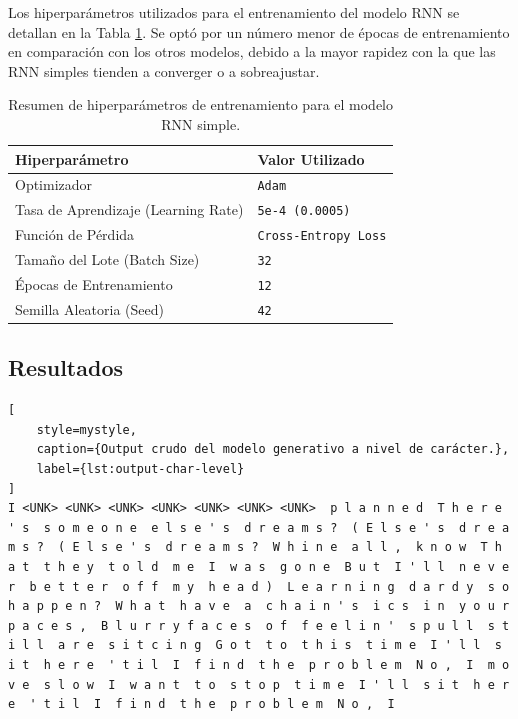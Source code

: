 Los hiperparámetros utilizados para el entrenamiento del modelo RNN se detallan en la Tabla \ref{tab:rnn_hyperparams}. Se optó por un número menor de épocas de entrenamiento en comparación con los otros modelos, debido a la mayor rapidez con la que las RNN simples tienden a converger o a sobreajustar.

\begin{table}[h!]
    \centering
    \caption{Resumen de hiperparámetros de entrenamiento para el modelo RNN simple.}
    \label{tab:rnn_hyperparams}
    \begin{tabular}{l|l}
        \hline
        \textbf{Hiperparámetro} & \textbf{Valor Utilizado} \\ \hline
        Optimizador & \texttt{Adam} \\
        Tasa de Aprendizaje (Learning Rate) & \texttt{5e-4 (0.0005)} \\
        Función de Pérdida & \texttt{Cross-Entropy Loss} \\
        Tamaño del Lote (Batch Size) & \texttt{32} \\
        Épocas de Entrenamiento & \texttt{12} \\
        Semilla Aleatoria (Seed) & \texttt{42} \\ \hline
    \end{tabular}
\end{table}

\subsection{Resultados}

\begin{lstlisting}[
    style=mystyle,
    caption={Output crudo del modelo generativo a nivel de carácter.},
    label={lst:output-char-level}
]
I <UNK> <UNK> <UNK> <UNK> <UNK> <UNK> <UNK>  p l a n n e d  T h e r e ' s  s o m e o n e  e l s e ' s  d r e a m s ?  ( E l s e ' s  d r e a m s ?  ( E l s e ' s  d r e a m s ?  W h i n e  a l l ,  k n o w  T h a t  t h e y  t o l d  m e  I  w a s  g o n e  B u t  I ' l l  n e v e r  b e t t e r  o f f  m y  h e a d )  L e a r n i n g  d a r d y  s o  h a p p e n ?  W h a t  h a v e  a  c h a i n ' s  i c s  i n  y o u r  p a c e s ,  B l u r r y f a c e s  o f  f e e l i n '  s p u l l  s t i l l  a r e  s i t c i n g  G o t  t o  t h i s  t i m e  I ' l l  s i t  h e r e  ' t i l  I  f i n d  t h e  p r o b l e m  N o ,  I  m o v e  s l o w  I  w a n t  t o  s t o p  t i m e  I ' l l  s i t  h e r e  ' t i l  I  f i n d  t h e  p r o b l e m  N o ,  I
\end{lstlisting}

